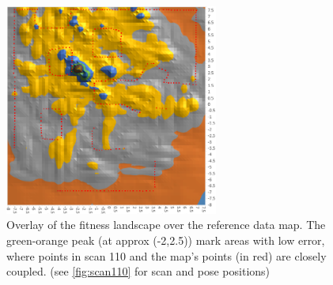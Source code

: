 \documentclass[authoryearcitations]{UoYCSproject}
\begin{document}
\begin{figure}[ht]
\centering
	\includegraphics[width=7cm,keepaspectratio]{images/landscape_overlay.png}
	\caption{Overlay of the fitness landscape over the reference data map. The green-orange peak (at approx (-2,2.5)) mark areas with low error, where points in scan 110 and the map's points (in red) are closely coupled. (see \autoref{fig:scan110} for scan and pose positions)}
	\label{fig:landscape_overlay}
\end{figure}
\end{document}
